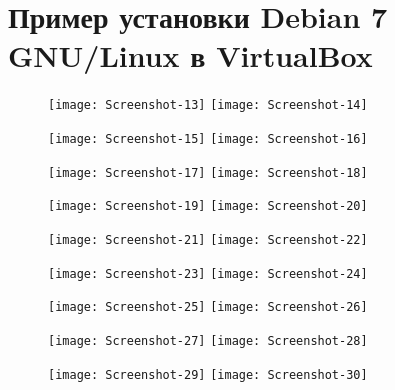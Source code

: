 \section{Пример установки Debian 7 GNU/Linux в VirtualBox} \label{pril:b}

\begin{figure}[ht]
    \centering
	\texttt{[image: Screenshot-13]}
	\texttt{[image: Screenshot-14]}
\end{figure}

\begin{figure}[ht]
    \centering
	\texttt{[image: Screenshot-15]}
	\texttt{[image: Screenshot-16]}
\end{figure}

\begin{figure}[ht]
    \centering
	\texttt{[image: Screenshot-17]}
	\texttt{[image: Screenshot-18]}
\end{figure}

\begin{figure}[ht]
    \centering
	\texttt{[image: Screenshot-19]}
	\texttt{[image: Screenshot-20]}
\end{figure}

\begin{figure}[ht]
    \centering
	\texttt{[image: Screenshot-21]}
	\texttt{[image: Screenshot-22]}
\end{figure}

\begin{figure}[ht]
    \centering
	\texttt{[image: Screenshot-23]}
	\texttt{[image: Screenshot-24]}
\end{figure}

\begin{figure}[ht]
    \centering
	\texttt{[image: Screenshot-25]}
	\texttt{[image: Screenshot-26]}
\end{figure}


\begin{figure}[ht]
    \centering
	\texttt{[image: Screenshot-27]}
	\texttt{[image: Screenshot-28]}
\end{figure}

\begin{figure}[ht]
    \centering
	\texttt{[image: Screenshot-29]}
	\texttt{[image: Screenshot-30]}
\end{figure}


